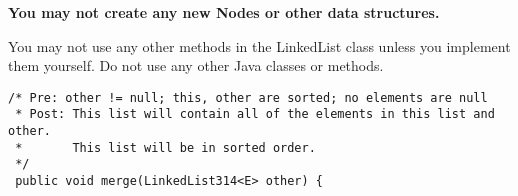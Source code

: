 \documentclass[12pt,letter]{article}
\begin{document}
\noindent \textbf{You may not create any new Nodes or other data structures.}

\noindent You may not use any other methods in the LinkedList class unless you implement them yourself.
\noindent Do not use any other Java classes or methods.

\clearpage
\begin{verbatim}
/* Pre: other != null; this, other are sorted; no elements are null
 * Post: This list will contain all of the elements in this list and other.
 *       This list will be in sorted order.
 */
 public void merge(LinkedList314<E> other) {
\end{verbatim}
\end{document}
